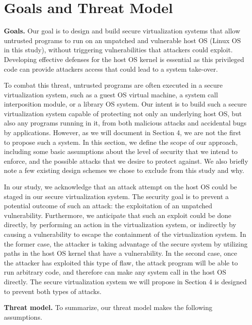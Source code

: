 \section{Goals and Threat Model}
\label{sec.motivation-and-background}

\textbf{Goals.}
Our goal is to design and build secure virtualization systems that allow
untrusted programs to run on an unpatched and vulnerable host OS (Linux OS in 
this study), without triggering vulnerabilities that attackers could exploit. 
Developing effective defenses for the host OS kernel is essential as this privileged code 
can provide attackers access that could lead to a system take-over.

To combat this threat, untrusted programs are often executed in a secure 
virtualization system, such as a guest OS virtual machine, a system call interposition 
module, or a library OS system. Our intent is to
build such a secure virtualization system capable of protecting not only
an underlying host OS, but also any programs running in it, from both malicious attacks
and accidental bugs by applications. However, as we will document
in Section 4, we are not the first to propose such a system.
In this section, we define the scope of our approach, including some basic
assumptions about the level of security that we intend to enforce,
and the possible attacks that we desire to protect against. We also briefly note
a few existing design schemes we chose to exclude from this study and why.

In our study, we acknowledge that an attack attempt on the host OS could be staged in our secure
virtualization system. The security goal is to prevent a potential outcome of such
an attack: the exploitation of an unpatched vulnerability. Furthermore, we
anticipate that such an exploit could be done directly, by performing an action in the
virtualization system, or indirectly by causing a vulnerability to escape the
containment of the virtualization system. In the former case, the attacker is
taking advantage of the secure system by utilizing paths in the host OS kernel
that have a vulnerability. In the second case, once the attacker has exploited
this type of flaw, the attack program will be able to run arbitrary code, and
therefore can make any system call in the host OS directly. 
The secure virtualization system we will propose
in Section 4 is designed to prevent both types of attacks.

\noindent
\textbf{Threat model.}
To summarize, our threat model makes the following assumptions.

